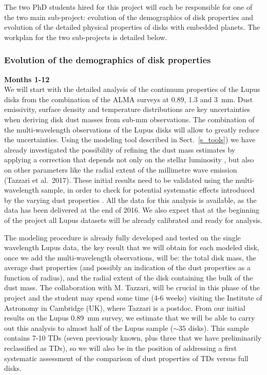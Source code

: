 \documentclass[10pt,fleqn,twoside]{article}
\begin{document}
The two PhD students hired for this project will each be responsible for one of the two main sub-project:
evolution of the demographics of disk properties and evolution of the detailed physical properties of disks with embedded planets. The workplan for the two sub-projects is detailed below.

\subsubsection{Evolution of the demographics of disk properties}

{\Tcol\bf Months 1-12}\\

We will start with the detailed analysis of the continuum properties of the Lupus disks from the combination of the ALMA surveys at 0.89, 1.3 and 3~mm. Dust emissivity, surface density and temperature
distributions are key uncertainties when deriving disk dust masses from sub-mm observations. The combination of the multi-wavelength observations of the Lupus disks will allow to greatly reduce the 
uncertainties. Using the modeling tool described in Sect.~\ref{s_tools}) we have already investigated the
possibility of refining the dust mass estimates by applying a correction that depends not only on the stellar luminosity \citep[see the attempts by][]{2013ApJ...771..129A,2016ApJ...819..102V}, but also on other parameters like the radial extent of the millimetre wave emission (Tazzari et al.~2017). These initial results need to be validated using the multi-wavelength sample, in order to check for potential systematic effects introduced by the varying dust properties \citep[see e.g.\ ][]{2011A&A...525A..12B,2013A&A...558A..64T,2016A&A...588A..53T}. All the data for this analysis is available, as the data has been delivered at the end of 2016. We also expect that at the beginning of the project all Lupus datasets will be already calibrated and ready for analysis.

The modeling procedure is already fully developed and tested on the single wavelength Lupus data, the key result that we will obtain for each modeled disk, once we add the multi-wavelength observations, will be: the total disk mass, the average dust properties (and possibly an indication of the dust properties as a function of radius), and the radial extent of the disk containing the bulk of the dust mass. The collaboration with M. Tazzari, will be crucial in this phase of the project and the student may spend 
some time (4-6 weeks) visiting the Institute of Astronomy in Cambridge (UK), where Tazzari is a postdoc. From our initial results on the Lupus 0.89~mm survey, we estimate that  we will be able to carry out this analysis to almost half of the Lupus sample ($\sim 35$ disks). This sample contains 7-10 TDs (seven previously known, plus three that we have preliminarily reclassified as TDs), so we will also be in the position of addressing a first systematic assessment of the comparison of dust properties of TDs versus full disks.
\end{document}
